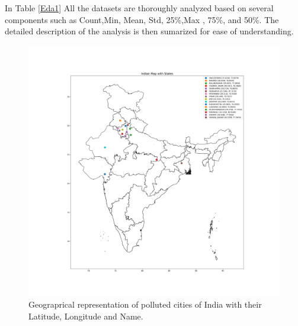 \documentclass[a4paper,fleqn]{cas-dc}
\begin{document}
In Table \ref{Eda1} All the datasets are thoroughly analyzed based on several components such as Count,Min, Mean, Std,  25\%,Max , 75\%, and 50\%. The detailed description of the analysis is then sumarized for ease of understanding.
\begin{figure}[h!]
	\centering
		\includegraphics[scale=0.3]{img/india_map}
	  \caption{ Geograprical representation of polluted cities of India with their Latitude, Longitude and Name. }\label{India map}
\end{figure}
\end{document}
